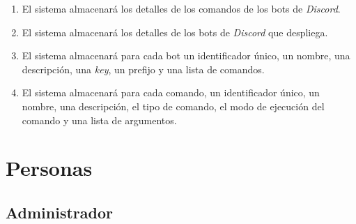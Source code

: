 \begin{enumerate}
	\item El sistema almacenará los detalles de los comandos de los bots de \textit{Discord}.
	\item El sistema almacenará los detalles de los bots de \textit{Discord} que despliega.
	\item El sistema almacenará para cada bot un identificador único, un nombre, una descripción, una \textit{key}, un prefijo y una lista de comandos.
	\item El sistema almacenará para cada comando, un identificador único, un nombre, una descripción, el tipo de comando, el modo de ejecución del comando y una lista de argumentos.
\end{enumerate}


\section{Personas}

\subsection{Administrador}
\label{sec:personaAdmin}

